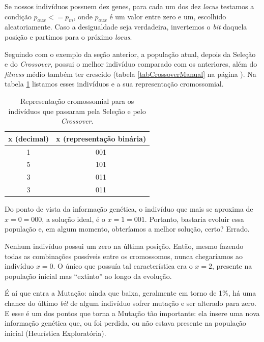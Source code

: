 	Se nossos indivíduos possuem dez genes, para cada um dos dez \textit{locus} testamos a condição $p_{aux} <= p_m$, onde $p_{aux}$ é um valor entre zero e um, escolhido aleatoriamente. Caso a desigualdade seja verdadeira, invertemos o \textit{bit} daquela posição e partimos para o próximo \textit{locus}.
	
	Seguindo com o exemplo da seção anterior, a população atual, depois da Seleção e do \textit{Crossover}, possui o melhor indivíduo comparado com os anteriores, além do \textit{fitness} médio também ter crescido (tabela \ref{tabCrossoverManual} na página \pageref{tabCrossoverManual}). Na tabela \ref{tabPopAntesMutacao} listamos esses indivíduos e a sua representação cromossomial.
	
	\begin{table}[htp]
 		\caption{\label{tabPopAntesMutacao}Representação cromossomial para os indivíduos que passaram pela Seleção e pelo \textit{Crossover}.}
 		\begin{center}
  		\begin{tabular}{c|c}
   			\hline
   			\textbf{x (decimal)}  & \textbf{x (representação binária)} \\
   			\hline
   			1 & 001 \\
   			5 & 101 \\ 
   			3 & 011 \\
   			3 & 011 \\
   			\hline
   		\end{tabular}
 		\end{center}
	\end{table}
	
	Do ponto de vista da informação genética, o indivíduo que mais se aproxima de $x = 0 = 000$, a solução ideal, é o $x = 1 = 001$. Portanto, bastaria evoluir essa população e, em algum momento, obteríamos a melhor solução, certo? Errado.
	
	Nenhum indivíduo possui um zero na última posição. Então, mesmo fazendo todas as combinações possíveis entre os cromossomos, nunca chegaríamos ao indivíduo $x = 0$. O único que possuía tal característica era o $x = 2$, presente na população inicial mas ``extinto'' ao longo da evolução.
	
	É aí que entra a Mutação: ainda que baixa, geralmente em torno de 1\%, há uma chance do último \textit{bit} de algum indivíduo sofrer mutação e ser alterado para zero. E esse é um dos pontos que torna a Mutação tão importante: ela insere uma nova informação genética que, ou foi perdida, ou não estava presente na população inicial (Heurística Exploratória).
	
